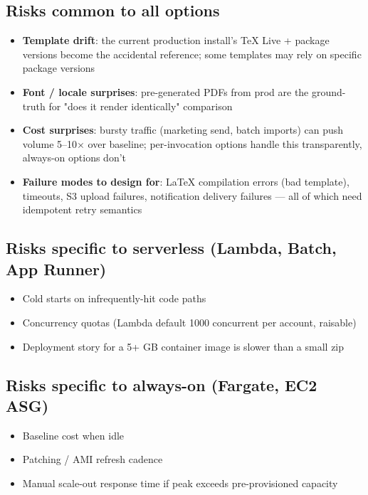 \documentclass[11pt,letterpaper]{article}
\begin{document}
\subsection{Risks common to all options}
\begin{itemize}[nosep]
  \item \textbf{Template drift}: the current production install's TeX Live + package versions become the accidental reference; some templates may rely on specific package versions
  \item \textbf{Font / locale surprises}: pre-generated PDFs from prod are the ground-truth for "does it render identically" comparison
  \item \textbf{Cost surprises}: bursty traffic (marketing send, batch imports) can push volume 5--10$\times$ over baseline; per-invocation options handle this transparently, always-on options don't
  \item \textbf{Failure modes to design for}: LaTeX compilation errors (bad template), timeouts, S3 upload failures, notification delivery failures --- all of which need idempotent retry semantics
\end{itemize}

\subsection{Risks specific to serverless (Lambda, Batch, App Runner)}
\begin{itemize}[nosep]
  \item Cold starts on infrequently-hit code paths
  \item Concurrency quotas (Lambda default 1000 concurrent per account, raisable)
  \item Deployment story for a 5+ GB container image is slower than a small zip
\end{itemize}

\subsection{Risks specific to always-on (Fargate, EC2 ASG)}
\begin{itemize}[nosep]
  \item Baseline cost when idle
  \item Patching / AMI refresh cadence
  \item Manual scale-out response time if peak exceeds pre-provisioned capacity
\end{itemize}
\end{document}
